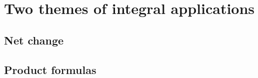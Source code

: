 \documentclass[../book/calcnotes.tex]{subfiles}
\begin{document}
\section{Two themes of integral applications}
\label{sec:integral.two-themes}

\subsection{Net change}
\label{sec:integral.net-change}

\subsection{Product formulas}
\label{sec:integral.product-formulas}
\begin{exercises}
\end{exercises}
\end{document}
